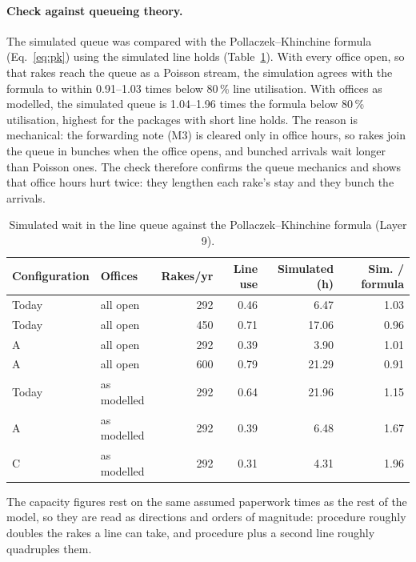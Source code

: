 \paragraph{Check against queueing theory.} The simulated queue was compared with the Pollaczek--Khinchine formula (Eq.~\eqref{eq:pk}) using the simulated line holds (Table~\ref{tab:pk}). With every office open, so that rakes reach the queue as a Poisson stream, the simulation agrees with the formula to within 0.91--1.03 times below 80\,\% line utilisation. With offices as modelled, the simulated queue is 1.04--1.96 times the formula below 80\,\% utilisation, highest for the packages with short line holds. The reason is mechanical: the forwarding note (M3) is cleared only in office hours, so rakes join the queue in bunches when the office opens, and bunched arrivals wait longer than Poisson ones. The check therefore confirms the queue mechanics and shows that office hours hurt twice: they lengthen each rake's stay and they bunch the arrivals.

\begin{table}[!htbp]
\centering
\caption[Simulated wait in the line queue against the Pollaczek--Khinchine formula]{Simulated wait in the line queue against the Pollaczek--Khinchine formula (Layer 9).}
\label{tab:pk}
\small
\begin{tabular}{@{}llrrrr@{}}
\toprule
\textbf{Configuration} & \textbf{Offices} & \textbf{Rakes/yr} & \textbf{Line use} & \textbf{Simulated (h)} & \textbf{Sim. / formula} \\
\midrule
Today & all open & 292 & 0.46 & 6.47 & 1.03 \\
Today & all open & 450 & 0.71 & 17.06 & 0.96 \\
A & all open & 292 & 0.39 & 3.90 & 1.01 \\
A & all open & 600 & 0.79 & 21.29 & 0.91 \\
\midrule
Today & as modelled & 292 & 0.64 & 21.96 & 1.15 \\
A & as modelled & 292 & 0.39 & 6.48 & 1.67 \\
C & as modelled & 292 & 0.31 & 4.31 & 1.96 \\
\bottomrule
\end{tabular}
\end{table}

The capacity figures rest on the same assumed paperwork times as the rest of the model, so they are read as directions and orders of magnitude: procedure roughly doubles the rakes a line can take, and procedure plus a second line roughly quadruples them.


